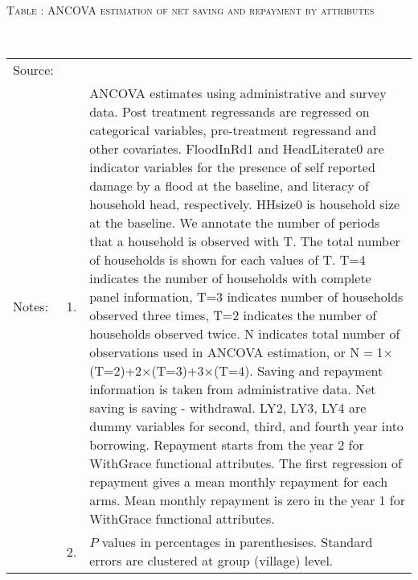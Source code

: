 \hspace{-1cm}\begin{minipage}[t]{14cm}
\hfil\textsc{\normalsize Table \thetable: ANCOVA estimation of net saving and repayment by attributes\label{tab ANCOVA Repayment attributes}}\\
\setlength{\tabcolsep}{1pt}
\setlength{\baselineskip}{8pt}
\renewcommand{\arraystretch}{.55}
\hspace{-.75cm}\\
\renewcommand{\arraystretch}{.8}
\setlength{\tabcolsep}{1pt}
\begin{tabular}{>{\hfill\scriptsize}p{1cm}<{}>{\hfill\scriptsize}p{.25cm}<{}>{\scriptsize}p{12cm}<{\hfill}}
Source:& \multicolumn{2}{l}{\scriptsize Estimated with GUK administrative and survey data.}\\
Notes: & 1. & ANCOVA estimates using administrative and survey data. Post treatment regressands are regressed on categorical variables, pre-treatment regressand and other covariates. \textsf{FloodInRd1} and \textsf{HeadLiterate0} are indicator variables for the presence of self reported damage by a flood at the baseline, and literacy of household head, respectively. \textsf{HHsize0} is household size at the baseline. We annotate the number of periods that a household is observed with \textsf{T}. The total number of households is shown for each values of \textsf{T}. \textsf{T=4} indicates the number of households with complete panel information, \textsf{T=3} indicates number of households observed three times, \textsf{T=2} indicates the number of households observed twice. \textsf{N} indicates total number of observations used in ANCOVA estimation, or \textsf{N$=$1$\times$(T=2)+2$\times$(T=3)+3$\times$(T=4)}.  Saving and repayment information is taken from administrative data. Net saving is saving - withdrawal. %
\textsf{LY2, LY3, LY4} are dummy variables for second, third, and fourth year into borrowing.  Repayment starts from the year 2 for \textsf{WithGrace} functional attributes. The first regression of repayment gives a mean monthly repayment for each arms. Mean monthly repayment is zero in the year 1 for \textsf{WithGrace} functional attributes.\\
& 2. & $P$ values in percentages in parenthesises. Standard errors are clustered at group (village) level.
\end{tabular}
\end{minipage}

